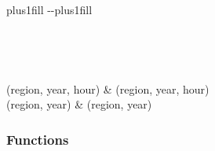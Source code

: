 \documentclass[letterpaper,10pt,english]{sphinxmanual}
\begin{document}
\begin{savenotes}
\sphinxatlongtablestart
\sphinxthistablewithglobalstyle
\sphinxthistablewithnovlinesstyle
\makeatletter
  \LTleft \@totalleftmargin plus1fill
  \LTright\dimexpr\columnwidth-\@totalleftmargin-\linewidth\relax plus1fill
\makeatother
\begin{longtable}{}
\sphinxtoprule
\endfirsthead

\\
\sphinxtoprule
\endhead

\sphinxbottomrule
{}\\
\endfoot

\endlastfoot
\sphinxtableatstartofbodyhook

\sphinxAtStartPar
{\hyperref[\detokenize{src.integrator.utilities:src.integrator.utilities.EI}]{}}(region, year, hour)
&
\sphinxAtStartPar
(region, year, hour)
\\
\sphinxhline
\sphinxAtStartPar
{\hyperref[\detokenize{src.integrator.utilities:src.integrator.utilities.HI}]{}}(region, year)
&
\sphinxAtStartPar
(region, year)
\\
\sphinxbottomrule
\end{longtable}
\sphinxtableafterendhook
\sphinxatlongtableend
\end{savenotes}
\subsubsection*{Functions}
\end{document}
